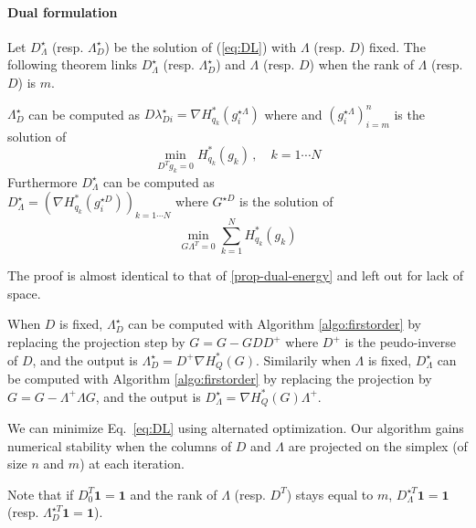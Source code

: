 \paragraph{Dual formulation} Let $D^\star_\Lambda$ (resp. $\Lambda^\star_D$) be the solution of (\ref{eq:DL}) with $\Lambda$ (resp. $D$) fixed. The following theorem links $D^\star_\Lambda$ (resp. $\Lambda^\star_D$) and $\Lambda$ (resp. $D$) when the rank of $\Lambda$ (resp. $D$) is $m$.

\begin{theorem}
$\Lambda^\star_D$ can be computed as $D\lambda^\star_{Di}=\nabla H^*_{q_k}(g^{\star\Lambda}_i)$ where and $(g^{\star\Lambda}_i)_{i=m}^n$ is the solution of
\begin{equation*}
\label{eq:lambdaSubProblems}
\displaystyle\min_{D^Tg_k=0} H^*_{q_k}(g_k)\,,\quad k=1\cdots N
\end{equation*}
Furthermore $D^\star_\Lambda$ can be computed as \\$D^\star_\Lambda=(\nabla H^*_{q_k}(g^{\star D}_i))_{k=1\cdots N}$ where $G^{\star D}$ is the solution of
\begin{equation*}
\displaystyle\min_{G\Lambda^T=0} \sum_{k=1}^N H^*_{q_k}(g_k)
\end{equation*}
\end{theorem}
The proof is almost identical to that of \ref{prop-dual-energy} and left out for lack of space.

When $D$ is fixed, $\Lambda^\star_D$ can be computed with Algorithm \ref{algo:firstorder} by replacing the projection step by $G=G-GDD^+$ where $D^+$ is the peudo-inverse of $D$, and the output is $\Lambda^\star_D= D^+\nabla H^*_Q(G)$. Similarily when $\Lambda$ is fixed, $D^\star_\Lambda$ can be computed with Algorithm \ref{algo:firstorder}  by replacing the projection by $G=G-\Lambda^+\Lambda G$, and the output is $D^\star_\Lambda= \nabla H^*_Q(G)\Lambda^+$.

We can minimize Eq.~\eqref{eq:DL} using alternated optimization. Our algorithm gains numerical stability when the columns of $D$ and $\Lambda$ are projected on the simplex (of size $n$ and $m$) at each iteration.

Note that if $D_0^T\mathbf{1}=\mathbf{1}$ and the rank of $\Lambda$ (resp. $D^T$) stays equal to $m$, $D^{\star T}_\Lambda\mathbf{1}=\mathbf{1}$ (resp. $\Lambda^{\star T}_D\mathbf{1}=\mathbf{1}$). 

